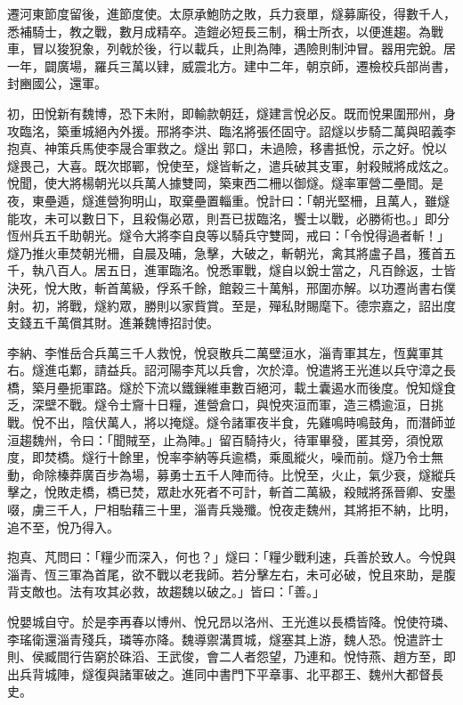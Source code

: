 \begin{pinyinscope}
 遷河東節度留後，進節度使。太原承鮑防之敗，兵力衰單，燧募廝役，得數千人，悉補騎士，教之戰，數月成精卒。造鎧必短長三制，稱士所衣，以便進趨。為戰車，冒以狻猊象，列戟於後，行以載兵，止則為陣，遇險則制沖冒。器用完銳。居一年，闢廣場，羅兵三萬以肄，威震北方。建中二年，朝京師，遷檢校兵部尚書，封豳國公，還軍。



 初，田悅新有魏博，恐下未附，即輸款朝廷，燧建言悅必反。既而悅果圍邢州，身攻臨洺，築重城絕內外援。邢將李洪、臨洺將張伾固守。詔燧以步騎二萬與昭義李抱真、神策兵馬使李晟合軍救之。燧出郭口，未過險，移書抵悅，示之好。悅以燧畏己，大喜。既次邯鄲，悅使至，燧皆斬之，遣兵破其支軍，射殺賊將成炫之。悅聞，使大將楊朝光以兵萬人據雙岡，築東西二柵以御燧。燧率軍營二壘間。是夜，東壘遁，燧進營狗明山，取棄壘置輜重。悅計曰：「朝光堅柵，且萬人，雖燧能攻，未可以數日下，且殺傷必眾，則吾已拔臨洺，饗士以戰，必勝術也。」即分恆州兵五千助朝光。燧令大將李自良等以騎兵守雙岡，戒曰：「令悅得過者斬！」燧乃推火車焚朝光柵，自晨及晡，急擊，大破之，斬朝光，禽其將盧子昌，獲首五千，執八百人。居五日，進軍臨洺。悅悉軍戰，燧自以銳士當之，凡百餘返，士皆決死，悅大敗，斬首萬級，俘系千餘，館穀三十萬斛，邢圍亦解。以功遷尚書右僕射。初，將戰，燧約眾，勝則以家貲賞。至是，殫私財賜麾下。德宗嘉之，詔出度支錢五千萬償其財。進兼魏博招討使。



 李納、李惟岳合兵萬三千人救悅，悅裒散兵二萬壁洹水，淄青軍其左，恆冀軍其右。燧進屯鄴，請益兵。詔河陽李芃以兵會，次於漳。悅遣將王光進以兵守漳之長橋，築月壘扼軍路。燧於下流以鐵鏁維車數百絕河，載土囊遏水而後度。悅知燧食乏，深壁不戰。燧令士齎十日糧，進營倉口，與悅夾洹而軍，造三橋逾洹，日挑戰。悅不出，陰伏萬人，將以掩燧。燧令諸軍夜半食，先雞鳴時鳴鼓角，而潛師並洹趨魏州，令曰：「聞賊至，止為陣。」留百騎持火，待軍畢發，匿其旁，須悅眾度，即焚橋。燧行十餘里，悅率李納等兵逾橋，乘風縱火，噪而前。燧乃令士無動，命除榛莽廣百步為場，募勇士五千人陣而待。比悅至，火止，氣少衰，燧縱兵擊之，悅敗走橋，橋已焚，眾赴水死者不可計，斬首二萬級，殺賊將孫晉卿、安墨啜，虜三千人，尸相駘藉三十里，淄青兵幾殲。悅夜走魏州，其將拒不納，比明，追不至，悅乃得入。



 抱真、芃問曰：「糧少而深入，何也？」燧曰：「糧少戰利速，兵善於致人。今悅與淄青、恆三軍為首尾，欲不戰以老我師。若分擊左右，未可必破，悅且來助，是腹背支敵也。法有攻其必救，故趨魏以破之。」皆曰：「善。」



 悅嬰城自守。於是李再春以博州、悅兄昂以洛州、王光進以長橋皆降。悅使符璘、李瑤衛還淄青殘兵，璘等亦降。魏導禦溝貫城，燧塞其上游，魏人恐。悅遣許士則、侯臧間行告窮於硃滔、王武俊，會二人者怨望，乃連和。悅恃燕、趙方至，即出兵背城陣，燧復與諸軍破之。進同中書門下平章事、北平郡王、魏州大都督長史。




\end{pinyinscope}
